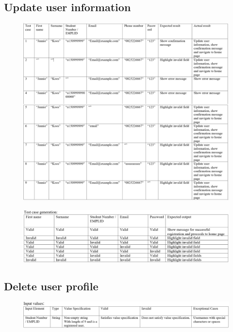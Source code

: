 \documentclass{article}
\begin{document}
\subsection{Update user information}
\begin{figure}[ht!]
\hspace*{-2.5cm} 
\includegraphics[width=180mm]{10.png}
\end{figure}

\begin{figure}[ht!]
\hspace*{-2.5cm} 
\includegraphics[width=180mm]{11.png}
\end{figure}

\subsection{Delete user profile}
\begin{figure}[ht!]
\hspace*{-2.5cm} 
\includegraphics[width=180mm]{12.png}
\end{figure}
\end{document}

